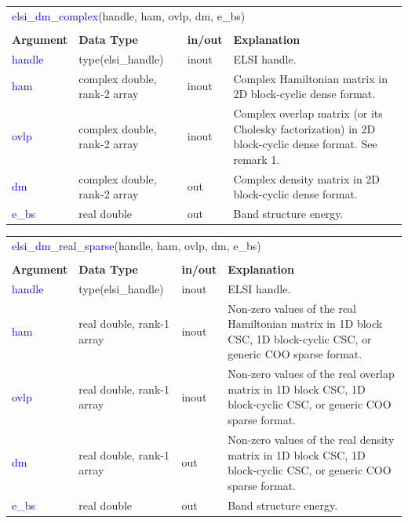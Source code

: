 \documentclass{report}
\newcommand{\tcb}[1]{\textcolor{blue}{#1}}
\begin{document}
\begin{tabular}[]{|p{20mm}|p{45mm}|p{15mm}|p{85mm}|}
\multicolumn{4}{l}{\tcb{elsi\_dm\_complex}(handle, ham, ovlp, dm, e\_bs)}\\
\multicolumn{4}{l}{}\\
\hline
\multicolumn{1}{|l|}{\textbf{Argument}} & \multicolumn{1}{l|}{\textbf{Data Type}} & \multicolumn{1}{l|}{\textbf{in/out}} & \multicolumn{1}{l|}{\textbf{Explanation}}\\
\hline
\tcb{handle} & type(elsi\_handle)           & inout & ELSI handle.\\
\hline
\tcb{ham}    & complex double, rank-2 array & inout & Complex Hamiltonian matrix in 2D block-cyclic dense format.\\
\hline
\tcb{ovlp}   & complex double, rank-2 array & inout & Complex overlap matrix (or its Cholesky factorization) in 2D block-cyclic dense format. See remark 1.\\
\hline
\tcb{dm}     & complex double, rank-2 array & out   & Complex density matrix in 2D block-cyclic dense format.\\
\hline
\tcb{e\_bs}  & real double                  & out   & Band structure energy.\\
\hline
\end{tabular}

\begin{tabular}[]{|p{20mm}|p{45mm}|p{15mm}|p{85mm}|}
\multicolumn{4}{l}{\tcb{elsi\_dm\_real\_sparse}(handle, ham, ovlp, dm, e\_bs)}\\
\multicolumn{4}{l}{}\\
\hline
\multicolumn{1}{|l|}{\textbf{Argument}} & \multicolumn{1}{l|}{\textbf{Data Type}} & \multicolumn{1}{l|}{\textbf{in/out}} & \multicolumn{1}{l|}{\textbf{Explanation}}\\
\hline
\tcb{handle} & type(elsi\_handle)        & inout & ELSI handle.\\
\hline
\tcb{ham}    & real double, rank-1 array & inout & Non-zero values of the real Hamiltonian matrix in 1D block CSC, 1D block-cyclic CSC, or generic COO sparse format.\\
\hline
\tcb{ovlp}   & real double, rank-1 array & inout & Non-zero values of the real overlap matrix in 1D block CSC, 1D block-cyclic CSC, or generic COO sparse format.\\
\hline
\tcb{dm}     & real double, rank-1 array & out   & Non-zero values of the real density matrix in 1D block CSC, 1D block-cyclic CSC, or generic COO sparse format.\\
\hline
\tcb{e\_bs}  & real double               & out   & Band structure energy.\\
\hline
\end{tabular}
\end{document}
